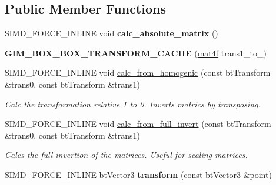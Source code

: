 \subsection*{Public Member Functions}
\begin{DoxyCompactItemize}
\item 
\hypertarget{class_g_i_m___b_o_x___b_o_x___t_r_a_n_s_f_o_r_m___c_a_c_h_e_a2401c410f11f28074f4bfdc2d2750620}{S\+I\+M\+D\+\_\+\+F\+O\+R\+C\+E\+\_\+\+I\+N\+L\+I\+N\+E void {\bfseries calc\+\_\+absolute\+\_\+matrix} ()}\label{class_g_i_m___b_o_x___b_o_x___t_r_a_n_s_f_o_r_m___c_a_c_h_e_a2401c410f11f28074f4bfdc2d2750620}

\item 
\hypertarget{class_g_i_m___b_o_x___b_o_x___t_r_a_n_s_f_o_r_m___c_a_c_h_e_a68f172ea609d1c6ade9a6b26cb3db5e6}{{\bfseries G\+I\+M\+\_\+\+B\+O\+X\+\_\+\+B\+O\+X\+\_\+\+T\+R\+A\+N\+S\+F\+O\+R\+M\+\_\+\+C\+A\+C\+H\+E} (\hyperlink{gim__geom__types_8h_afe82e22fa06924ae0d25352cc0fa7ffd}{mat4f} trans1\+\_\+to\+\_)}\label{class_g_i_m___b_o_x___b_o_x___t_r_a_n_s_f_o_r_m___c_a_c_h_e_a68f172ea609d1c6ade9a6b26cb3db5e6}

\item 
\hypertarget{class_g_i_m___b_o_x___b_o_x___t_r_a_n_s_f_o_r_m___c_a_c_h_e_abdaefe67a2f2bbf2b89d0ad74fb9a4a5}{S\+I\+M\+D\+\_\+\+F\+O\+R\+C\+E\+\_\+\+I\+N\+L\+I\+N\+E void \hyperlink{class_g_i_m___b_o_x___b_o_x___t_r_a_n_s_f_o_r_m___c_a_c_h_e_abdaefe67a2f2bbf2b89d0ad74fb9a4a5}{calc\+\_\+from\+\_\+homogenic} (const bt\+Transform \&trans0, const bt\+Transform \&trans1)}\label{class_g_i_m___b_o_x___b_o_x___t_r_a_n_s_f_o_r_m___c_a_c_h_e_abdaefe67a2f2bbf2b89d0ad74fb9a4a5}

\begin{DoxyCompactList}\small\item\em Calc the transformation relative 1 to 0. Inverts matrics by transposing. \end{DoxyCompactList}\item 
\hypertarget{class_g_i_m___b_o_x___b_o_x___t_r_a_n_s_f_o_r_m___c_a_c_h_e_a29e5ec39ed30a8bc7180a90cba68dc43}{S\+I\+M\+D\+\_\+\+F\+O\+R\+C\+E\+\_\+\+I\+N\+L\+I\+N\+E void \hyperlink{class_g_i_m___b_o_x___b_o_x___t_r_a_n_s_f_o_r_m___c_a_c_h_e_a29e5ec39ed30a8bc7180a90cba68dc43}{calc\+\_\+from\+\_\+full\+\_\+invert} (const bt\+Transform \&trans0, const bt\+Transform \&trans1)}\label{class_g_i_m___b_o_x___b_o_x___t_r_a_n_s_f_o_r_m___c_a_c_h_e_a29e5ec39ed30a8bc7180a90cba68dc43}

\begin{DoxyCompactList}\small\item\em Calcs the full invertion of the matrices. Useful for scaling matrices. \end{DoxyCompactList}\item 
\hypertarget{class_g_i_m___b_o_x___b_o_x___t_r_a_n_s_f_o_r_m___c_a_c_h_e_a75dabf90de88c3077dfba3dbc2005e19}{S\+I\+M\+D\+\_\+\+F\+O\+R\+C\+E\+\_\+\+I\+N\+L\+I\+N\+E bt\+Vector3 {\bfseries transform} (const bt\+Vector3 \&\hyperlink{structpoint}{point})}\label{class_g_i_m___b_o_x___b_o_x___t_r_a_n_s_f_o_r_m___c_a_c_h_e_a75dabf90de88c3077dfba3dbc2005e19}

\end{DoxyCompactItemize}
